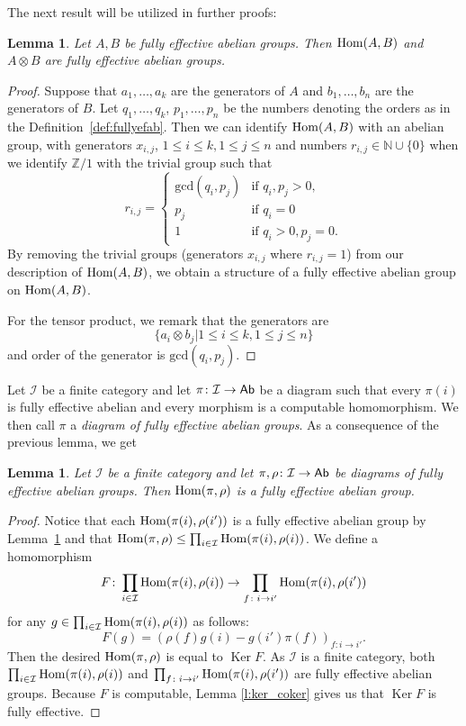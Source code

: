 \documentclass[12pt,a4wide]{article}
\theoremstyle{plain}
\newtheorem{lem}[thm]{Lemma}
\theoremstyle{definition}
\newcommand{\Ker}{\mathop\mathrm{Ker}\nolimits}
\newcommand{\thedim}{{n}}
\newcommand{\thedimm}{{k}}
\renewcommand\:{\colon}
\def\ot{\otimes}
\newcommand{\dpi}{\pi}
\newcommand{\drho}{\rho}
\newcommand{\icat}{\mathcal I}
\begin{document}
The next result will be utilized in further proofs:
\begin{lem}\label{lem:minihom}
Let $A,B$ be fully effective abelian groups. Then $\mathop\mathrm{Hom}\nolimits (A,B)$ and  $A \ot B$ are fully effective abelian groups.
\end{lem}
\begin{proof}
Suppose that $a_1, \ldots, a_\thedimm$ are the generators of $A$ and $b_1, \ldots, b_\thedim$ are the generators of $B$. Let $q_1, \ldots, q_\thedimm$, $p_1, \ldots, p_\thedim$ be the numbers denoting the orders as in the Definition~\ref{def:fullyefab}. 
Then we can identify $\mathop\mathrm{Hom}\nolimits (A,B)$ with an abelian group, with generators $x_{i,j}$,  $1\leq i\leq \thedimm, 1\leq j \leq \thedim$ and numbers $r_{i,j} \in \mathbb{N} \cup \{ 0\}$ when we identify $\mathbb{Z}/1$ with the trivial group such that
\[
r_{i,j} =
\left\{
	\begin{array}{ll}  
		\mbox{gcd}(q_i, p_j) & \mbox{if } q_i, p_j >0, \\
		p_j  & \mbox{if } q_i = 0\\
		1 & \mbox{if } q_i > 0, p_j = 0.
		\end{array}
\right.
\]
By removing the trivial groups (generators $x_{i,j}$ where $r_{i,j} = 1$) from our description of $\mathop\mathrm{Hom}\nolimits (A,B)$, we obtain a structure of a fully effective abelian group on $\mathop\mathrm{Hom}\nolimits (A,B)$.

For the tensor product, we remark that the generators are 
\[
\{a_i \ot b_j | 1 \leq  i\leq \thedimm, 1 \leq  j\leq \thedim \}
\]
and order of the generator is $\mathrm{gcd}(q_i, p_j)$.
\end{proof}
Let $\icat$ be a finite category and let $\dpi \colon \icat \to \Ab$ be a diagram such that every $\dpi(i)$ is fully effective abelian and every morphism is a computable homomorphism. We then call $\dpi$ a \emph{diagram of fully effective abelian groups}. As a consequence of the previous lemma, we get
\begin{lem}\label{lem:hom}
Let $\icat$ be a finite category and let $\dpi, \drho \colon \icat \to \Ab$ be diagrams of fully effective abelian groups. Then $\Hom(\dpi, \drho)$ is a fully effective abelian group.
\end{lem}
\begin{proof}
Notice that each $\Hom(\dpi(i), \drho (i')) $ is a fully effective abelian group by  Lemma~\ref{lem:minihom} and that $\Hom(\dpi, \drho) \leq \prod_{i\in \icat} \Hom(\dpi(i), \drho (i))$. We define a ho\-mo\-mor\-phi\-sm
\[
F\colon  \prod_{i\in \icat} \Hom(\dpi(i), \drho (i)) \to  \prod_{f\colon i\to i'}\Hom(\dpi(i), \drho (i'))
\]
for any $g \in \prod_{i\in \icat} \Hom(\dpi(i), \drho (i)) $ as follows:
\[
F(g) =   (\drho(f)g(i) - g(i')\dpi(f))_{f\colon i\to i'}.
\]
Then the desired $\Hom(\dpi, \drho)$ is equal to $\Ker F$. As $\icat$ is a finite category, both  $ \prod_{i\in \icat} \Hom(\dpi(i), \drho (i))$ and $\prod_{f\colon i\to i'}\Hom(\dpi(i), \drho (i'))$ are fully effective abelian groups. Because $F$ is computable, Lemma \ref{l:ker_coker} gives us that $\Ker F$ is fully effective.
\end{proof}
\end{document}
